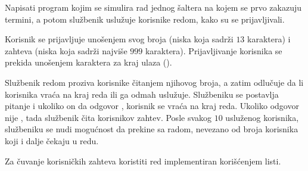 \begin{Answer}[ref=606]
\end{Answer}



\begin{Exercise}[label=607]

Napisati program kojim se simulira rad jednog šaltera na kojem se prvo zakazuju 
termini, a potom službenik uslužuje korisnike redom, kako su se prijavljivali.

Korisnik se prijavljuje unošenjem svog  broja (niska koja sadrži $13$ karaktera) i zahteva (niska koja sadrži najviše $999$ karaktera). Prijavljivanje korisnika se prekida unošenjem karaktera za kraj ulaza ().

Službenik redom proziva korisnike čitanjem njihovog  broja, a zatim odlučuje da li 
korisnika vraća na kraj reda ili ga odmah uslužuje. Službeniku se postavlja pitanje 
 i ukoliko on da odgovor , 
korisnik se vraća na kraj reda. Ukoliko odgovor nije , tada službenik čita korisnikov zahtev.  
Posle svakog $10$ usluženog korisnika, službeniku se nudi 
mogućnost da prekine sa radom, nevezano od broja korisnika koji i dalje čekaju u redu. 

Za čuvanje korisničkih zahteva koristiti red implementiran korišćenjem listi.
\end{Exercise}
\begin{Answer}[ref=607]
\end{Answer}



